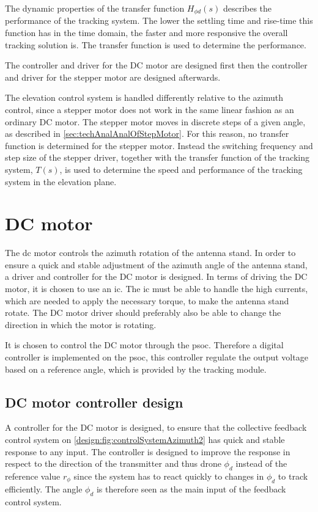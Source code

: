 The dynamic properties of the transfer function $H_{\phi d}(s)$ describes the performance of the tracking system. The lower the settling time and rise-time this function has in the time domain, the faster and more responsive the overall tracking solution is. The transfer function is used to determine the performance. 

The controller and driver for the DC motor are designed first then the controller and driver for the stepper motor are designed afterwards. 

The elevation control system is handled differently relative to the azimuth control, since a stepper motor does not work in the same linear fashion as an ordinary DC motor. The stepper motor moves in discrete steps of a given angle, as described in \autoref{sec:techAnalAnalOfStepMotor}. For this reason, no transfer function is determined for the stepper motor. Instead the switching frequency and step size of the stepper driver, together with the transfer function of the tracking system, $T(s)$, is used to determine the speed and performance of the tracking system in the elevation plane. 


\section{DC motor}\label{sec:design:DCMotorController}
The \gls{dc} motor controls the azimuth rotation of the antenna stand. In order to ensure a quick and stable adjustment of the azimuth angle of the antenna stand, a driver and controller for the DC motor is designed.
In terms of driving the DC motor, it is chosen to use an \gls{ic}. The \gls{ic} must be able to handle the high currents, which are needed to apply the necessary torque, to make the antenna stand rotate. The DC motor driver should preferably also be able to change the direction in which the motor is rotating.

It is chosen to control the DC motor through the \gls{psoc}. Therefore a digital controller is implemented on the \gls{psoc}, this controller regulate the output voltage based on a reference angle, which is provided by the tracking module.

\subsection{DC motor controller design}\label{sec:design:DCMotorControllerDesign}
A controller for the DC motor is designed, to ensure that the collective feedback control system on \autoref{design:fig:controlSystemAzimuth2} has quick and stable response to any input. The controller is designed to improve the response in respect to the direction of the transmitter and thus drone $\phi_d$ instead of the reference value $r_\phi$ since the system has to react quickly to changes in $\phi_d$ to track efficiently. The angle $\phi_d$ is therefore seen as the main input of the feedback control system.

